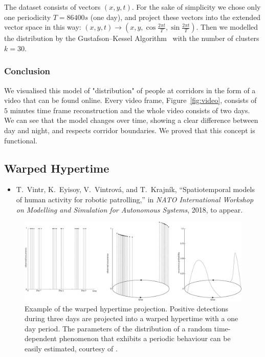 The dataset consists of vectors $\left(x, y, t\right)$.
For the sake of simplicity we chose only one periodicity $T = 86400 s$ (one day), and project these vectors into the extended vector space in this way: $\left(x, y, t\right) \rightarrow \left(x, y, \cos\frac{2\pi t}{T}, \sin\frac{2\pi t}{T}\right)$.
Then we modelled the distribution by the Gustafson--Kessel Algorithm~\cite{gustafson1979fuzzy} with the number of clusters $k=30$.

\subsubsection{Conclusion}

We visualised this model of "distribution" of people at corridors in the form of a video that can be found online.
Every video frame, Figure~\ref{fig:video}, consists of $5$ minutes time frame reconstruction and the whole video consists of two days.
We can see that the model changes over time, showing a clear difference between day and night, and respects corridor boundaries. 
We proved that this concept is functional.




\subsection{Warped Hypertime}

\begin{itemize}
    \item T.~Vintr, K.~Eyisoy, V.~Vintrov{\' a}, and T.~Krajn{\'i}k, ``Spatiotemporal models of human activity for robotic patrolling,'' in \emph{NATO International Workshop on Modelling and Simulation for Autonomous Systems}, 2018, to appear.
\end{itemize}

\begin{figure}[!t]
\begin{center}
    \includegraphics[width=1.0\columnwidth]{fig/hypertime_graph}
    \caption{Example of the warped hypertime projection. Positive detections during three days are projected into a warped hypertime with a one day period. The parameters of the distribution of a random time-dependent phenomenon that exhibits a periodic behaviour can be easily estimated, courtesy of \cite{Vintr2018Practical}.\label{fig:hypertime}}

\end{center}
\end{figure}




